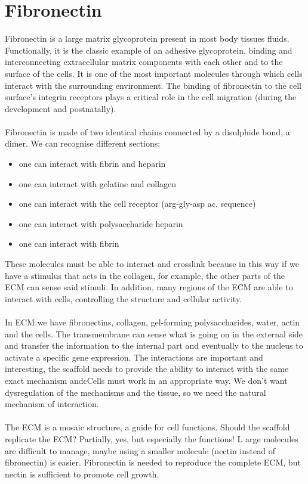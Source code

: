 \section{Fibronectin}
Fibronectin is a large matrix glycoprotein present in most body tissues fluids.
Functionally, it is the classic example of an adhesive glycoprotein, binding and interconnecting extracellular matrix components with each other and to the surface of the cells.
It is one of the most important molecules through which cells interact with the surrounding environment.
The binding of fibronectin to the cell surface’s integrin receptors plays a critical role in the cell migration (during the development and postnatally).
\\
\\
\noindent
Fibronectin is made of two identical chains connected by a disulphide bond, a dimer.
We can recognise different sections:
\begin{itemize}
\item one can interact with fibrin and heparin
\item one can interact with gelatine and collagen
\item one can interact with the cell receptor (arg-gly-asp ac. sequence)
\item one can interact with polysaccharide heparin
\item one can interact with fibrin
\end{itemize}
\noindent
These molecules must be able to interact and crosslink because in this way if we have a stimulus that acts in the collagen, for example, the other parts of the ECM can sense said stimuli. In addition, many regions of the ECM are able to interact with cells, controlling the structure and cellular activity.
\\
\\
\noindent
In ECM we have fibronectins, collagen, gel-forming polysaccharides, water, actin and the cells.
The transmembrane can sense what is going on in the external side and transfer the information to the internal part and eventually to the nucleus to activate a specific gene expression.
The interactions are important and interesting, the scaffold needs to provide the ability to interact with the same exact mechanism andcCells must work in an appropriate way.
We don’t want dysregulation of the mechanisms and the tissue, so we need the natural mechanism of interaction.
\\
\\
\noindent
The ECM is a mosaic structure, a guide for cell functions.
Should the scaffold replicate the ECM? Partially, yes, but especially the functions! L
arge molecules are difficult to manage, maybe using a smaller molecule (nectin instead of fibronectin) is easier.
Fibronectin is needed to reproduce the complete ECM, but nectin is sufficient to promote cell growth.

